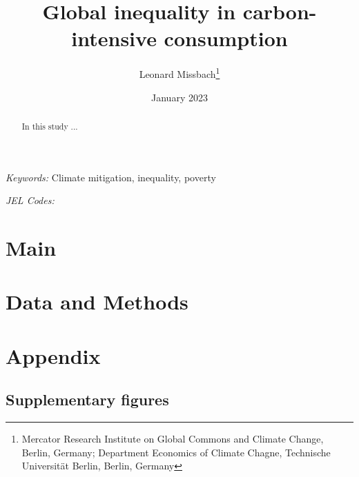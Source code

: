 \documentclass[12pt, a4paper]{article}
\title{Global inequality in carbon-intensive consumption}
\author{Leonard Missbach\thanks{Mercator Research Institute on Global Commons and Climate Change, Berlin, Germany; Department Economics of Climate Chagne, Technische Universität Berlin, Berlin, Germany}}
\date{January 2023}
\begin{document}
\maketitle
\begin{abstract}
  In this study ...
\end{abstract}

\smallskip

\noindent \small \textit{Keywords:} Climate mitigation, inequality, poverty

\noindent \small \textit{JEL Codes:}

\thispagestyle{empty}
\clearpage
\setcounter{page}{1}

\section{Main} \label{sec:main}

\clearpage

\section{Data and Methods} \label{sec:data_and_methods}

\clearpage

\printbibliography

\clearpage

\appendix

\section{Appendix} \label{sec:appendix}

\renewcommand\thefigure{\thesection.\arabic{figure}}
\renewcommand\thetable{\thesection.\arabic{table}}
\setcounter{figure}{0}
\setcounter{table}{0}

\subsection{Supplementary figures} \label{sec:figures}
\end{document}
